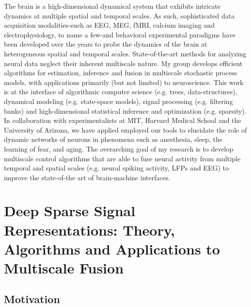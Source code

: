 \documentclass[12pt]{article}
\begin{document}
The brain is a high-dimensional dynamical system that exhibits intricate dynamics at multiple spatial and temporal scales. As such, sophisticated data acquisition modalities-such as EEG, MEG, fMRI, calcium imaging and electrophysiology, to name a few-and behavioral experimental paradigms have been developed over the years to probe the dynamics of the brain at heterogeneous spatial and temporal scales. %
State-of-the-art methods for analyzing neural data neglect their inherent multiscale nature.  My group develops efficient algorithms for estimation, inference and fusion in multiscale stochastic process models, with applications primarily (but not limited) to neuroscience. This work is at the interface of algorithmic computer science (e.g. trees, data-structures), dynamical modeling (e.g. state-space models), signal processing (e.g. filtering banks) and high-dimensional statistical inference and optimization (e.g. sparsity). In collaboration with experimentalists at MIT, Harvard Medical School and the University of Arizona, we have applied employed our tools to elucidate the role of dynamic networks of neurons in phenomena such as anesthesia, sleep, the learning of fear, and aging. The overarching goal of my research is to develop multiscale control algorithms that are able to fuse neural activity from multiple temporal and spatial scales (e.g. neural spiking activity, LFPs and EEG) to improve the state-of-the art of brain-machine interfaces.



\section*{Deep Sparse Signal Representations: Theory, Algorithms and Applications to Multiscale Fusion}

\subsection*{Motivation}
\end{document}

